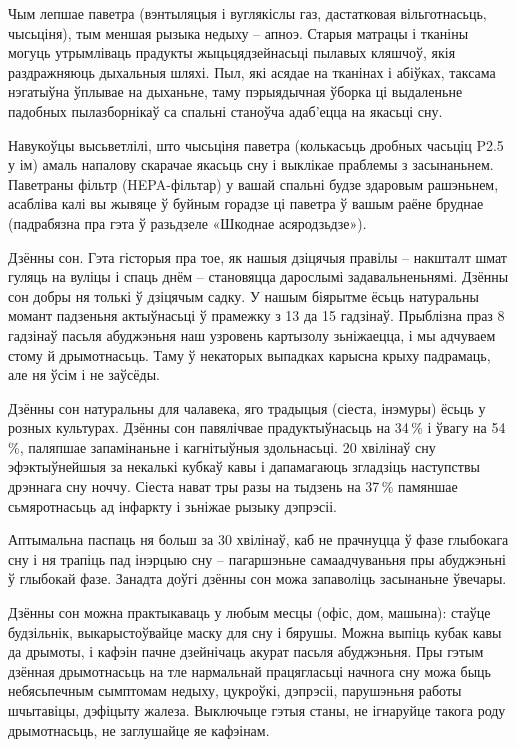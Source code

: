 Чым лепшае паветра (вэнтыляцыя і вуглякіслы газ, дастатковая вільготнасьць, чысьціня), тым меншая рызыка недыху – апноэ. Старыя матрацы і тканіны могуць утрымліваць прадукты жыцьцядзейнасьці пылавых кляшчоў, якія раздражняюць дыхальныя шляхі. Пыл, які асядае на тканінах і абіўках, таксама нэгатыўна ўплывае на дыханьне, таму пэрыядычная ўборка ці выдаленьне падобных пылазборнікаў са спальні станоўча адаб'ецца на якасьці сну.

Навукоўцы высьветлілі, што чысьціня паветра (колькасьць дробных часьціц P2.5 у ім) амаль напалову скарачае якасьць сну і выклікае праблемы з засынаньнем. Паветраны фільтр (HEPA-фільтар) у вашай спальні будзе здаровым рашэньнем, асабліва калі вы жывяце ў буйным горадзе ці паветра ў вашым раёне бруднае (падрабязна пра гэта ў разьдзеле «Шкоднае асяродзьдзе»).

Дзённы сон. Гэта гісторыя пра тое, як нашыя дзіцячыя правілы – накшталт шмат гуляць на вуліцы і спаць днём – становяцца дарослымі задавальненьнямі. Дзённы сон добры ня толькі ў дзіцячым садку. У нашым біярытме ёсьць натуральны момант падзеньня актыўнасьці ў прамежку з 13 да 15 гадзінаў. Прыблізна праз 8 гадзінаў пасьля абуджэньня наш узровень картызолу зьніжаецца, і мы адчуваем стому й дрымотнасьць. Таму ў некаторых выпадках карысна крыху падрамаць, але ня ўсім і не заўсёды.

Дзённы сон натуральны для чалавека, яго традыцыя (сіеста, інэмуры) ёсьць у розных культурах. Дзённы сон павялічвае прадуктыўнасьць на 34\,\% і ўвагу на 54\,\%, паляпшае запамінаньне і кагнітыўныя здольнасьці. 20 хвілінаў сну эфэктыўнейшыя за некалькі кубкаў кавы і дапамагаюць згладзіць наступствы дрэннага сну ноччу. Сіеста нават тры разы на тыдзень на 37\,\% памяншае сьмяротнасьць ад інфаркту і зьніжае рызыку дэпрэсіі.

Аптымальна паспаць ня больш за 30 хвілінаў, каб не прачнуцца ў фазе глыбокага сну і ня трапіць пад інэрцыю сну – пагаршэньне самаадчуваньня пры абуджэньні ў глыбокай фазе. Занадта доўгі дзённы сон можа запаволіць засынаньне ўвечары.

Дзённы сон можна практыкаваць у любым месцы (офіс, дом, машына): стаўце будзільнік, выкарыстоўвайце маску для сну і бярушы. Можна выпіць кубак кавы да дрымоты, і кафэін пачне дзейнічаць акурат пасьля абуджэньня. Пры гэтым дзённая дрымотнасьць на тле нармальнай працягласьці начнога сну можа быць небясьпечным сымптомам недыху, цукроўкі, дэпрэсіі, парушэньня работы шчытавіцы, дэфіцыту жалеза. Выключыце гэтыя станы, не ігнаруйце такога роду дрымотнасьць, не заглушайце яе кафэінам.

